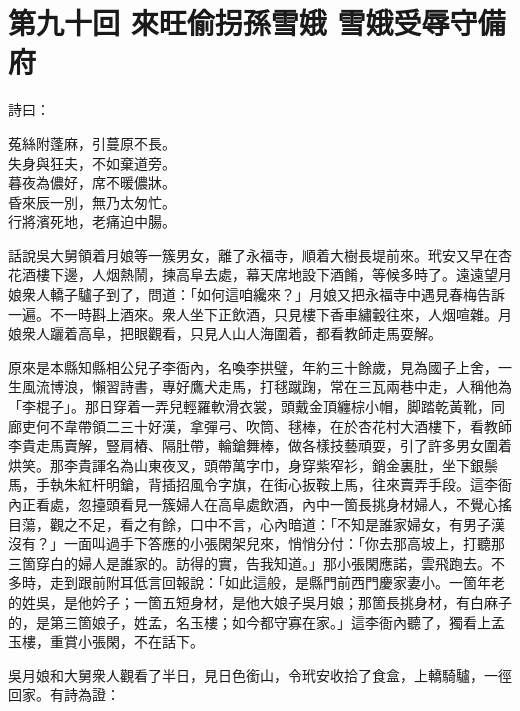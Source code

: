 
\chapter*{第九十回 來旺偷拐孫雪娥 雪娥受辱守備府}


詩曰：

\begin{myquote}
菟絲附蓬麻，引蔓原不長。\\失身與狂夫，不如棄道旁。\\暮夜為儂好，席不暖儂牀。\\昏來辰一別，無乃太匆忙。\\行將濱死地，老痛迫中腸。
\end{myquote}

話說吳大舅領着月娘等一簇男女，離了永福寺，順着大樹長堤前來。玳安又早在杏花酒樓下邊，人烟熱鬧，揀高阜去處，幕天席地設下酒餚，等候多時了。遠遠望月娘衆人轎子驢子到了，問道：「如何這咱纔來？」月娘又把永福寺中遇見春梅告訴一遍。不一時斟上酒來。衆人坐下正飲酒，只見樓下香車繡轂往來，人烟喧雜。月娘衆人躧着高阜，把眼觀看，只見人山人海圍着，都看教師走馬耍解。

原來是本縣知縣相公兒子李衙內，名喚李拱璧，年約三十餘歲，見為國子上舍，一生風流博浪，懶習詩書，專好鷹犬走馬，打毬蹴踘，常在三瓦兩巷中走，人稱他為「李棍子」。那日穿着一弄兒輕羅軟滑衣裳，頭戴金頂纏棕小帽，脚踏乾黃靴，同廊吏何不韋帶領二三十好漢，拿彈弓、吹筒、毬棒，在於杏花村大酒樓下，看教師李貴走馬賣解，豎肩樁、隔肚帶，輪鎗舞棒，做各樣技藝頑耍，引了許多男女圍着烘笑。那李貴諢名為山東夜叉，頭帶萬字巾，身穿紫窄衫，銷金裏肚，坐下銀鬃馬，手執朱紅杆明鎗，背插招風令字旗，在街心扳鞍上馬，往來賣弄手段。這李衙內正看處，忽擡頭看見一簇婦人在高阜處飲酒，內中一箇長挑身材婦人，不覺心搖目蕩，觀之不足，看之有餘，口中不言，心內暗道：「不知是誰家婦女，有男子漢沒有？」{}一面叫過手下答應的小張閑架兒來，悄悄分付：「你去那高坡上，打聽那三箇穿白的婦人是誰家的。訪得的實，告我知道。」那小張閑應諾，雲飛跑去。不多時，走到跟前附耳低言回報說：「如此這般，是縣門前西門慶家妻小。一箇年老的姓吳，是他妗子；一箇五短身材，是他大娘子吳月娘；那箇長挑身材，有白麻子的，是第三箇娘子，姓孟，名玉樓；如今都守寡在家。」這李衙內聽了，獨看上孟玉樓，重賞小張閑，不在話下。

吳月娘和大舅衆人觀看了半日，見日色銜山，令玳安收拾了食盒，上轎騎驢，一徑回家。有詩為證：

